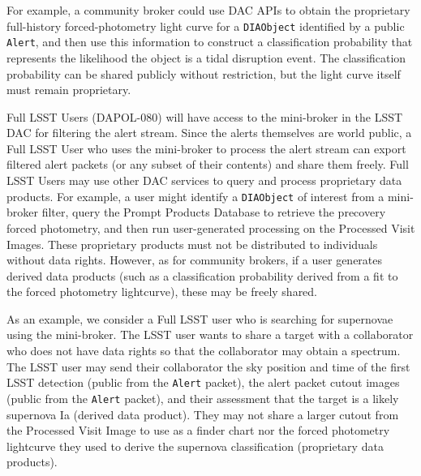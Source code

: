 For  example,  a community broker could use DAC APIs to obtain the proprietary full-history forced-photometry light curve for a \texttt{DIAObject} identified by a public {\tt Alert}, 
and then use this information to construct a classification probability that represents the likelihood the object is a tidal disruption event.
The classification probability can be shared publicly without restriction, but the light curve itself must remain proprietary.



Full LSST Users (DAPOL-080) will have access to the mini-broker in the LSST DAC for filtering the alert stream.
Since the alerts themselves are world public, a Full LSST User who uses the mini-broker to process the alert stream can export filtered alert packets (or any subset of their contents) and share them freely.
Full LSST Users may use other DAC services to query and process proprietary data products. 
For example, a user might identify a \texttt{DIAObject} of interest from a mini-broker filter, query the Prompt Products Database to retrieve the precovery forced photometry, and then run user-generated processing on the Processed Visit Images.
These proprietary products must not be distributed to individuals without data rights.
However, as for community brokers, if a user generates derived data products (such as a classification probability derived from a fit to the forced photometry lightcurve), these may be freely shared.

As an example, we consider a Full LSST user who is searching for supernovae using the mini-broker.
The LSST user wants to share a target with a collaborator who does not have data rights so that the collaborator may obtain a spectrum.
The LSST user may send their collaborator the sky position and time of the first LSST detection (public from the \texttt{Alert} packet), the alert packet cutout images (public from the \texttt{Alert} packet), and their assessment that the target is a likely supernova Ia (derived data product).
They may not share a larger cutout from the Processed Visit Image to use as a finder chart nor the forced photometry lightcurve they used to derive the supernova classification (proprietary data products).
